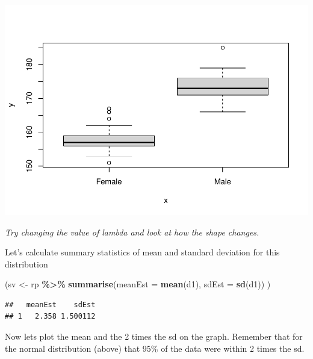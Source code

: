 \documentclass[
  a4paperpaper,
]{book}
\newenvironment{Shaded}{\begin{snugshade}}{\end{snugshade}}
\newcommand{\DataTypeTok}[1]{\textcolor[rgb]{0.13,0.29,0.53}{#1}}
\newcommand{\KeywordTok}[1]{\textcolor[rgb]{0.13,0.29,0.53}{\textbf{#1}}}
\newcommand{\NormalTok}[1]{#1}
\newcommand{\OperatorTok}[1]{\textcolor[rgb]{0.81,0.36,0.00}{\textbf{#1}}}
\newcommand{\StringTok}[1]{\textcolor[rgb]{0.31,0.60,0.02}{#1}}
\begin{document}
\begin{center}\includegraphics{BB852_files/figure-latex/unnamed-chunk-101-1} \end{center}

\emph{Try changing the value of lambda and look at how the shape changes.}

Let's calculate summary statistics of mean and standard deviation for this distribution

\begin{Shaded}
\begin{Highlighting}[]
\NormalTok{(sv \textless{}{-}}\StringTok{ }\NormalTok{rp }\OperatorTok{\%\textgreater{}\%}\StringTok{ }
\StringTok{  }\KeywordTok{summarise}\NormalTok{(}\DataTypeTok{meanEst =} \KeywordTok{mean}\NormalTok{(d1),}
            \DataTypeTok{sdEst =} \KeywordTok{sd}\NormalTok{(d1))}
\NormalTok{ )}
\end{Highlighting}
\end{Shaded}

\begin{verbatim}
##   meanEst    sdEst
## 1   2.358 1.500112
\end{verbatim}

Now lets plot the mean and the 2 times the sd on the graph. Remember that for the normal distribution (above) that 95\% of the data were within 2 times the sd.
\end{document}

